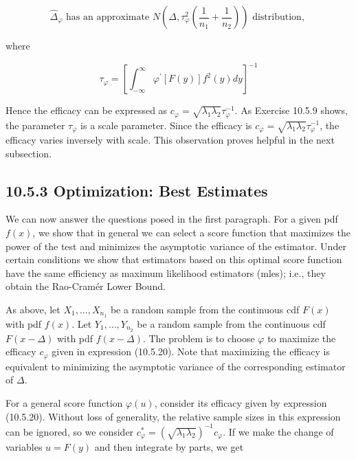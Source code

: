 \begin{equation*}
\widehat{\Delta}_{\varphi} \text { has an approximate } N\left(\Delta, \tau_{\varphi}^{2}\left(\frac{1}{n_{1}}+\frac{1}{n_{2}}\right)\right) \text { distribution, } \tag{10.5.23}
\end{equation*}


where


\begin{equation*}
\tau_{\varphi}=\left[\int_{-\infty}^{\infty} \varphi^{\prime}[F(y)] f^{2}(y) d y\right]^{-1} \tag{10.5.24}
\end{equation*}


Hence the efficacy can be expressed as $c_{\varphi}=\sqrt{\lambda_{1} \lambda_{2}} \tau_{\varphi}^{-1}$. As Exercise 10.5.9 shows, the parameter $\tau_{\varphi}$ is a scale parameter. Since the efficacy is $c_{\varphi}=\sqrt{\lambda_{1} \lambda_{2}} \tau_{\varphi}^{-1}$, the efficacy varies inversely with scale. This observation proves helpful in the next subsection.

\subsection*{10.5.3 Optimization: Best Estimates}
We can now answer the questions posed in the first paragraph. For a given pdf $f(x)$, we show that in general we can select a score function that maximizes the power of the test and minimizes the asymptotic variance of the estimator. Under certain conditions we show that estimators based on this optimal score function have the same efficiency as maximum likelihood estimators (mles); i.e., they obtain the Rao-Cramér Lower Bound.

As above, let $X_{1}, \ldots, X_{n_{1}}$ be a random sample from the continuous cdf $F(x)$ with pdf $f(x)$. Let $Y_{1}, \ldots, Y_{n_{2}}$ be a random sample from the continuous cdf $F(x-\Delta)$ with pdf $f(x-\Delta)$. The problem is to choose $\varphi$ to maximize the efficacy $c_{\varphi}$ given in expression (10.5.20). Note that maximizing the efficacy is equivalent to minimizing the asymptotic variance of the corresponding estimator of $\Delta$.

For a general score function $\varphi(u)$, consider its efficacy given by expression (10.5.20). Without loss of generality, the relative sample sizes in this expression\\
can be ignored, so we consider $c_{\varphi}^{*}=\left(\sqrt{\lambda_{1} \lambda_{2}}\right)^{-1} c_{\varphi}$. If we make the change of variables $u=F(y)$ and then integrate by parts, we get


